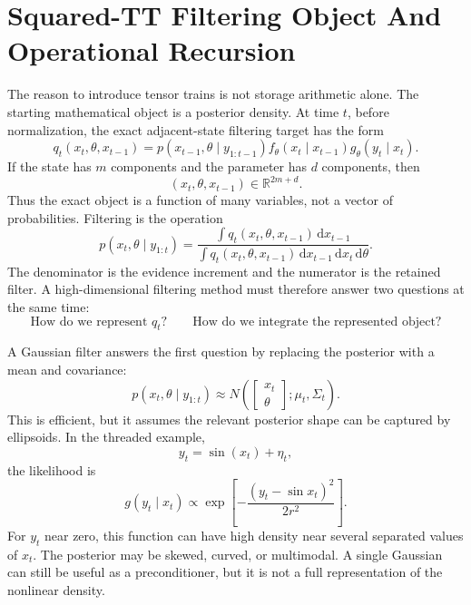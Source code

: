 \documentclass[11pt]{article}
\numberwithin{equation}{section}
\newcommand{\R}{\mathbb R}
\newcommand{\dd}{\,\mathrm d}
\begin{document}
\section{Squared-TT Filtering Object And Operational Recursion}

The reason to introduce tensor trains is not storage arithmetic alone.  The
starting mathematical object is a posterior density.  At time \(t\), before
normalization, the exact adjacent-state filtering target has the form
\begin{equation}
    q_t(x_t,\theta,x_{t-1})
    =
    p(x_{t-1},\theta\mid y_{1:t-1})
    f_\theta(x_t\mid x_{t-1})
    g_\theta(y_t\mid x_t).
    \label{eq:p25-bridge-1}
\end{equation}
If the state has \(m\) components and the parameter has \(d\) components, then
\begin{equation}
    (x_t,\theta,x_{t-1})\in\R^{2m+d}.
    \label{eq:p25-bridge-2}
\end{equation}
Thus the exact object is a function of many variables, not a vector of
probabilities.  Filtering is the operation
\begin{equation}
    p(x_t,\theta\mid y_{1:t})
    =
    \frac{\int q_t(x_t,\theta,x_{t-1})\dd x_{t-1}}
    {\int q_t(x_t,\theta,x_{t-1})\dd x_{t-1}\dd x_t\dd\theta}.
    \label{eq:p25-bridge-3}
\end{equation}
The denominator is the evidence increment and the numerator is the retained
filter.  A high-dimensional filtering method must therefore answer two
questions at the same time:
\begin{equation}
    \text{How do we represent }q_t?
    \qquad
    \text{How do we integrate the represented object?}
    \label{eq:p25-bridge-4}
\end{equation}

A Gaussian filter answers the first question by replacing the posterior with a
mean and covariance:
\begin{equation}
    p(x_t,\theta\mid y_{1:t})
    \approx
    N\!\left(
    \begin{bmatrix}x_t\\\theta\end{bmatrix};
    \mu_t,\Sigma_t
    \right).
    \label{eq:p25-bridge-5}
\end{equation}
This is efficient, but it assumes the relevant posterior shape can be captured
by ellipsoids.  In the threaded example,
\begin{equation}
    y_t=\sin(x_t)+\eta_t,
    \label{eq:p25-bridge-6}
\end{equation}
the likelihood is
\begin{equation}
    g(y_t\mid x_t)
    \propto
    \exp\!\left[
    -\frac{(y_t-\sin x_t)^2}{2r^2}
    \right].
    \label{eq:p25-bridge-7}
\end{equation}
For \(y_t\) near zero, this function can have high density near several
separated values of \(x_t\).  The posterior may be skewed, curved, or
multimodal.  A single Gaussian can still be useful as a preconditioner, but it
is not a full representation of the nonlinear density.
\end{document}
